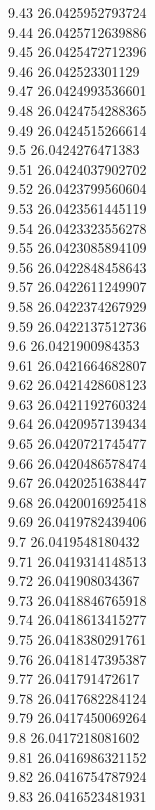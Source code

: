 {9.43	26.0425952793724\\
9.44	26.0425712639886\\
9.45	26.0425472712396\\
9.46	26.042523301129\\
9.47	26.0424993536601\\
9.48	26.0424754288365\\
9.49	26.0424515266614\\
9.5	26.0424276471383\\
9.51	26.0424037902702\\
9.52	26.0423799560604\\
9.53	26.0423561445119\\
9.54	26.0423323556278\\
9.55	26.0423085894109\\
9.56	26.0422848458643\\
9.57	26.0422611249907\\
9.58	26.0422374267929\\
9.59	26.0422137512736\\
9.6	26.0421900984353\\
9.61	26.0421664682807\\
9.62	26.0421428608123\\
9.63	26.0421192760324\\
9.64	26.0420957139434\\
9.65	26.0420721745477\\
9.66	26.0420486578474\\
9.67	26.0420251638447\\
9.68	26.0420016925418\\
9.69	26.0419782439406\\
9.7	26.0419548180432\\
9.71	26.0419314148513\\
9.72	26.041908034367\\
9.73	26.0418846765918\\
9.74	26.0418613415277\\
9.75	26.0418380291761\\
9.76	26.0418147395387\\
9.77	26.041791472617\\
9.78	26.0417682284124\\
9.79	26.0417450069264\\
9.8	26.0417218081602\\
9.81	26.0416986321152\\
9.82	26.0416754787924\\
9.83	26.0416523481931\\
}
